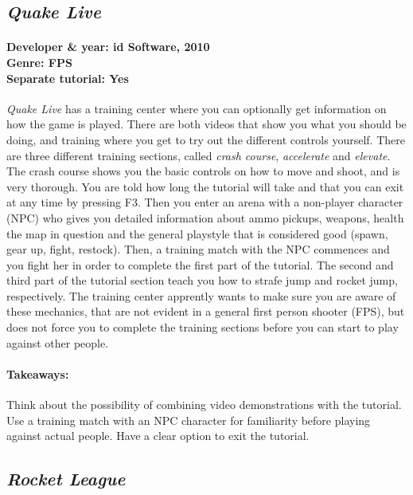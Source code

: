 \subsection{\textit{Quake Live}}
\paragraph{Developer \& year: id Software, 2010 \\ Genre: FPS \\ Separate tutorial: Yes \\}
\textit{Quake Live} has a training center where you can optionally get information on how the game is played. There are both videos that show you what you should be doing, and training where you get to try out the different controls yourself. There are three different training sections, called \textit{crash course}, \textit{accelerate} and \textit{elevate}. The crash course shows you the basic controls on how to move and shoot, and is very thorough. You are told how long the tutorial will take and that you can exit at any time by pressing F3. Then you enter an arena with a non-player character (NPC) who gives you detailed information about ammo pickups, weapons, health the map in question and the general playstyle that is considered good (spawn, gear up, fight, restock). Then, a training match with the NPC commences and you fight her in order to complete the first part of the tutorial. The second and third part of the tutorial section teach you how to strafe jump and rocket jump, respectively. The training center apprently wants to make sure you are aware of these mechanics, that are not evident in a general first person shooter (FPS), but does not force you to complete the training sections before you can start to play against other people.
\paragraph{Takeaways:}
Think about the possibility of combining video demonstrations with the tutorial.
Use a training match with an NPC character for familiarity before playing against actual people. Have a clear option to exit the tutorial.

\subsection{\textit{Rocket League}}
